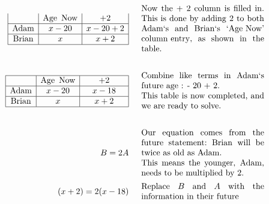 \begin{example}
\begin{eqnarray*}
\begin{array}{|c|c|c|}
      & \tmop{Age~} \tmop{Now} & + 2\\
      \hline
      \tmop{Adam} & x - 20 & x - 20 + 2\\
      \hline
      \tmop{Brian} & x & x + 2\\
      \hline
    \end{array} &  & \begin{array}{p{0.425\textwidth}}
      \tmop{Now} \tmop{the} + 2 \tmop{column} \tmop{is} \tmop{filled}
      \tmop{in}. \tmop{This} \tmop{is} \tmop{done} \tmop{by} \tmop{adding}
      2 \tmop{to} \tmop{both} \tmop{Adam`s} \tmop{and} \tmop{Brian`s}
      \tmop{`Age~Now'} \tmop{column~entry,} \tmop{as} \tmop{shown}
      \tmop{in} \tmop{the} \tmop{table}.
    \end{array}\\
    &  & \\
    \begin{array}{|c|c|c|}
      \hline
      & \tmop{Age~} \tmop{Now} & + 2\\
      \hline
      \tmop{Adam} & x - 20 & ~~~x - 18~~~\\
      \hline
      \tmop{Brian} & x & x + 2\\
      \hline
    \end{array} &  & \begin{array}{p{0.425\textwidth}}
      \tmop{Combine} \tmop{like} \tmop{terms} \tmop{in} \tmop{Adam`s}
      \tmop{future} \tmop{age} : - 20 + 2.\\
      \tmop{This} \tmop{table} \tmop{is} \tmop{now} \tmop{completed},
      \tmop{and} \tmop{we} \tmop{are} \tmop{ready} \tmop{to} \tmop{solve}.
    \end{array}\\
    &  & \\
    B = 2 A &  & \begin{array}{p{0.425\textwidth}}
      \tmop{Our} \tmop{equation} \tmop{comes} \tmop{from} \tmop{the}
      \tmop{future} \tmop{statement:} \tmop{Brian} \tmop{will} \tmop{be} \tmop{twice} \tmop{as} \tmop{old} \tmop{as} \tmop{Adam}.\\
			\tmop{This} \tmop{means} \tmop{the} \tmop{younger}, \tmop{Adam}, \tmop{needs} \tmop{to} \tmop{be}
      \tmop{multiplied} \tmop{by} 2.
    \end{array}\\
	    (x + 2) = 2 (x - 18) &  & \begin{array}{p{0.425\textwidth}}
      \tmop{Replace} $B$ \tmop{and} $A$ \tmop{with} \tmop{the} \tmop{information}
      \tmop{in} \tmop{their} \tmop{future}

\end{array}
\end{eqnarray*}
\end{example}
